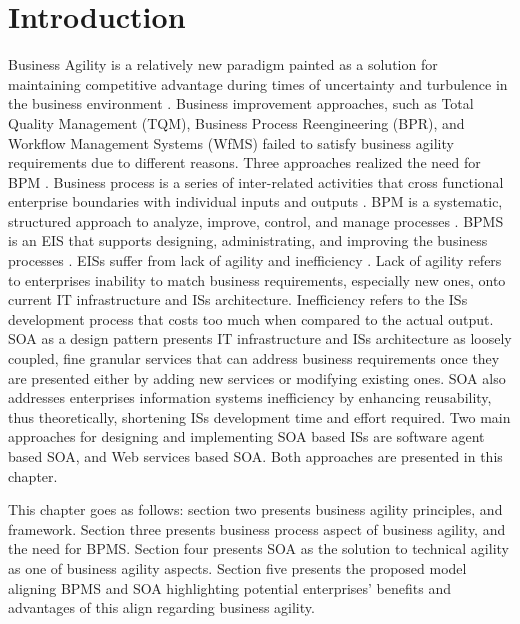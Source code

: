 \documentclass[12pt,a4paper,final,twoside,onecolumn,titlepage]{book}
\begin{document}
\section{Introduction}
Business Agility is a relatively new paradigm painted as a solution for maintaining competitive advantage during times of uncertainty and turbulence in the business environment \cite{BS01}. Business improvement approaches, such as Total Quality Management (TQM), Business Process Reengineering (BPR), and Workflow Management Systems (WfMS) failed to satisfy business agility requirements due to different reasons. Three approaches realized the need for \gls{BPM} \cite{BS02}. Business process is a series of inter-related activities that cross functional enterprise boundaries with individual inputs and outputs \cite{BS03, BS04}. \gls{BPM} is a systematic, structured approach to analyze, improve, control, and manage processes \cite{BS02}. \gls{BPMS} is an \gls{EIS} that supports designing, administrating, and improving the business processes \cite{BS05}. \gls{EIS}s suffer from lack of agility and inefficiency \cite{BS06}.  Lack of agility refers to enterprises inability to match business requirements, especially new ones, onto current IT infrastructure and \gls{IS}s architecture. Inefficiency refers to the \gls{IS}s development process that costs too much when compared to the actual output. \gls{SOA} as a design pattern presents IT infrastructure and \gls{IS}s architecture as loosely coupled, fine granular services that can address business requirements once they are presented either by adding new services or modifying existing ones. \gls{SOA} also addresses enterprises information systems inefficiency by enhancing reusability, thus theoretically, shortening \gls{IS}s development time and effort required. Two main approaches for designing and implementing \gls{SOA} based \gls{IS}s are software agent based \gls{SOA}, and Web services based \gls{SOA}. Both approaches are presented in this chapter.

This chapter goes as follows: section two presents business agility principles, and framework. Section three presents business process aspect of business agility, and the need for \gls{BPMS}. Section four presents \gls{SOA} as the solution to technical agility as one of business agility aspects. Section five presents the proposed model aligning \gls{BPMS} and \gls{SOA} highlighting potential enterprises’ benefits and advantages of this align regarding business agility.  
\end{document}
